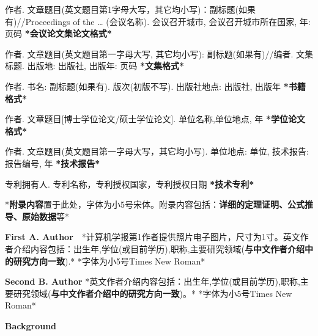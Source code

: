 \documentclass[10.5pt,compsoc]{CjC}
\theoremstyle{mystyle}
\begin{document}
\begin{CJK*}{GBK}{song}
\begin{thebibliography}{99}
作者.
文章题目(英文题目第1字母大写，其它均小写)：副标题(如果有)//Proceedings of
the {\ldots} (会议名称). 会议召开城市, 会议召开城市所在国家, 年: 页码
\textbf{*会议论文集论文格式*}

作者. 文章题目(英文题目第一字母大写, 其它均小写):
副标题(如果有)//编者. 文集标题. 出版地: 出版社, 出版年: 页码
\textbf{*文集格式*}

作者. 书名: 副标题(如果有). 版次(初版不写). 出版社地点: 出版社,
出版年 \textbf{*书籍格式*}

作者. 文章题目[博士学位论文/硕士学位论文]. 单位名称,单位地点, 年
\textbf{*学位论文格式*}

作者. 文章题目(英文题目第一字母大写，其它均小写). 单位地点: 单位,
技术报告: 报告编号, 年 \textbf{*技术报告*}

专利拥有人. 专利名称，专利授权国家，专利授权日期
\textbf{*技术专利*}
  \end{thebibliography}

\begin{strip}
\end{strip}


{\setlength\parindent{2em}
*\textbf{附录内容}置于此处，字体为小5号宋体。附录内容包括：\textbf{详细的定理证明、公式推导、原始数据}等*}

\begin{strip}
\end{strip}

\begin{biography}
\noindent
\textbf{First A. Author}\ \ *计算机学报第1作者提供照片电子图片，尺寸为1寸。英文作者介绍内容包括：出生年,学位(或目前学历),职称,主要研究领域(\textbf{与中文作者介绍中的研究方向一致}).*
*字体为小5号Times New Roman*

\end{biography}

\begin{biography}
\noindent
\textbf{Second B. Author} *英文作者介绍内容包括：出生年,学位(或目前学历),职称,主要研究领域(\textbf{与中文作者介绍中的研究方向一致})。*
*字体为小5号Times New Roman*
\end{biography}
\begin{strip}
\end{strip}
\noindent \textbf{Background}


\end{CJK*}
\end{document}
